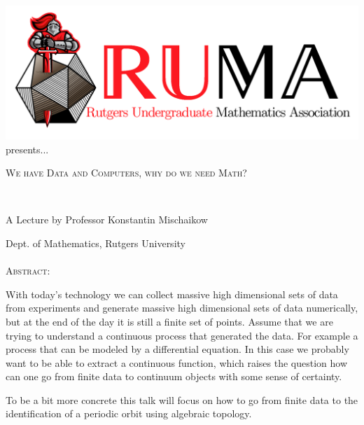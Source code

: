 \documentclass[12pt]{article}
\begin{document}

\begin{center}\includegraphics[scale=.45]{RUMAlogo.png}\\
presents... \\
\begin{spacing}{1}
{\fontsize{30}{30}\selectfont  \textsc{We have Data and Computers, why do we need Math?}} \end{spacing}

 

~~\\
\begin{spacing}{1.5}
{\fontsize{22}{22} \selectfont A Lecture by Professor Konstantin Mischaikow}  \end{spacing} 
\large Dept. of Mathematics, Rutgers University \\~~\\

\normalsize
\textsc{Abstract:}

\large
With today's technology we can collect massive high dimensional sets of data from experiments and generate massive high dimensional sets of data numerically, but at the end of the day it is still a finite set of points.  Assume that we are trying to understand a continuous process that generated the data. For example a process that can be modeled by a differential equation. In this case we probably want to be able to extract a continuous function, which raises the question how can one go from finite data to continuum objects with some sense of certainty. 
\vspace{2mm}

To be a bit more concrete this talk will focus on how to go from finite data to the identification of a periodic orbit using algebraic topology.


\end{center}
\end{document}
